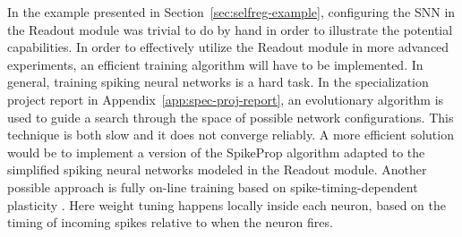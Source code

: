 In the example presented in Section~\ref{sec:selfreg-example}, configuring the
SNN in the Readout module was trivial to do by hand in order to illustrate the
potential capabilities. In order to effectively utilize the Readout module in
more advanced experiments, an efficient training algorithm will have to be
implemented. In general, training spiking neural networks is a hard task. In the
specialization project report in Appendix~\ref{app:spec-proj-report}, an
evolutionary algorithm is used to guide a search through the space of possible
network configurations. This technique is both slow and it does not converge
reliably. A more efficient solution would be to implement a version of the
SpikeProp algorithm \cite{Bohte2002} adapted to the simplified spiking neural
networks modeled in the Readout module. Another possible approach is fully
on-line training based on spike-timing-dependent plasticity \cite{Markram2012}.
Here weight tuning happens locally inside each neuron, based on the timing of
incoming spikes relative to when the neuron fires.

\cleardoublepage
